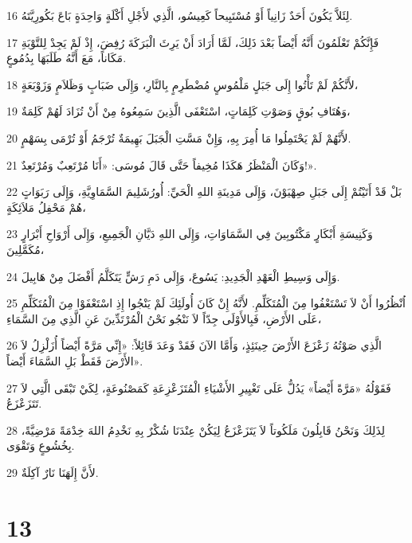 \par 16 لِئَلاَّ يَكُونَ أَحَدٌ زَانِياً أَوْ مُسْتَبِيحاً كَعِيسُو، الَّذِي لأَجْلِ أَكْلَةٍ وَاحِدَةٍ بَاعَ بَكُورِيَّتَهُ.
\par 17 فَإِنَّكُمْ تَعْلَمُونَ أَنَّهُ أَيْضاً بَعْدَ ذَلِكَ، لَمَّا أَرَادَ أَنْ يَرِثَ الْبَرَكَةَ رُفِضَ، إِذْ لَمْ يَجِدْ لِلتَّوْبَةِ مَكَاناً، مَعَ أَنَّهُ طَلَبَهَا بِدُمُوعٍ.
\par 18 لأَنَّكُمْ لَمْ تَأْتُوا إِلَى جَبَلٍ مَلْمُوسٍ مُضْطَرِمٍ بِالنَّارِ، وَإِلَى ضَبَابٍ وَظَلاَمٍ وَزَوْبَعَةٍ،
\par 19 وَهُتَافِ بُوقٍ وَصَوْتِ كَلِمَاتٍ، اسْتَعْفَى الَّذِينَ سَمِعُوهُ مِنْ أَنْ تُزَادَ لَهُمْ كَلِمَةٌ،
\par 20 لأَنَّهُمْ لَمْ يَحْتَمِلُوا مَا أُمِرَ بِهِ، وَإِنْ مَسَّتِ الْجَبَلَ بَهِيمَةٌ تُرْجَمُ أَوْ تُرْمَى بِسَهْمٍ.
\par 21 وَكَانَ الْمَنْظَرُ هَكَذَا مُخِيفاً حَتَّى قَالَ مُوسَى: «أَنَا مُرْتَعِبٌ وَمُرْتَعِدٌ!».
\par 22 بَلْ قَدْ أَتَيْتُمْ إِلَى جَبَلِ صِهْيَوْنَ، وَإِلَى مَدِينَةِ اللهِ الْحَيِّ: أُورُشَلِيمَ السَّمَاوِيَّةِ، وَإِلَى رَبَوَاتٍ هُمْ مَحْفِلُ مَلاَئِكَةٍ،
\par 23 وَكَنِيسَةِ أَبْكَارٍ مَكْتُوبِينَ فِي السَّمَاوَاتِ، وَإِلَى اللهِ دَيَّانِ الْجَمِيعِ، وَإِلَى أَرْوَاحِ أَبْرَارٍ مُكَمَّلِينَ،
\par 24 وَإِلَى وَسِيطِ الْعَهْدِ الْجَدِيدِ: يَسُوعَ، وَإِلَى دَمِ رَشٍّ يَتَكَلَّمُ أَفْضَلَ مِنْ هَابِيلَ.
\par 25 اُنْظُرُوا أَنْ لاَ تَسْتَعْفُوا مِنَ الْمُتَكَلِّمِ. لأَنَّهُ إِنْ كَانَ أُولَئِكَ لَمْ يَنْجُوا إِذِ اسْتَعْفَوْا مِنَ الْمُتَكَلِّمِ عَلَى الأَرْضِ، فَبِالأَوْلَى جِدّاً لاَ نَنْجُو نَحْنُ الْمُرْتَدِّينَ عَنِ الَّذِي مِنَ السَّمَاءِ،
\par 26 الَّذِي صَوْتُهُ زَعْزَعَ الأَرْضَ حِينَئِذٍ، وَأَمَّا الآنَ فَقَدْ وَعَدَ قَائِلاً: «إِنِّي مَرَّةً أَيْضاً أُزَلْزِلُ لاَ الأَرْضَ فَقَطْ بَلِ السَّمَاءَ أَيْضاً».
\par 27 فَقَوْلُهُ «مَرَّةً أَيْضاً» يَدُلُّ عَلَى تَغْيِيرِ الأَشْيَاءِ الْمُتَزَعْزِعَةِ كَمَصْنُوعَةٍ، لِكَيْ تَبْقَى الَّتِي لاَ تَتَزَعْزَعُ.
\par 28 لِذَلِكَ وَنَحْنُ قَابِلُونَ مَلَكُوتاً لاَ يَتَزَعْزَعُ لِيَكُنْ عِنْدَنَا شُكْرٌ بِهِ نَخْدِمُ اللهَ خِدْمَةً مَرْضِيَّةً، بِخُشُوعٍ وَتَقْوَى.
\par 29 لأَنَّ إِلَهَنَا نَارٌ آكِلَةٌ.

\chapter{13}

